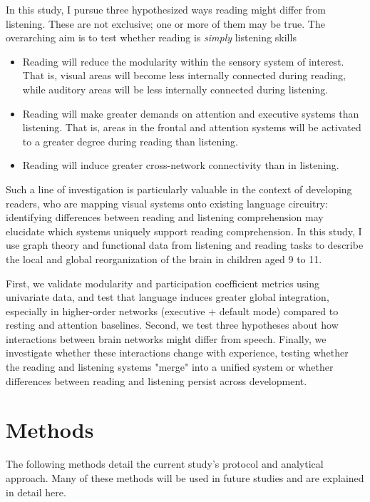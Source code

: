 In this study, I pursue three hypothesized ways reading might differ from listening. These are not exclusive; one or more of them may be true. The overarching aim is to test whether reading is \textit{simply} listening skills

\begin{itemize}
	\item Reading will reduce the modularity within the sensory system of interest. That is, visual areas will become less internally connected during reading, while auditory areas will be less internally connected during listening.
	\item Reading will make greater demands on attention and executive systems than listening. That is, areas in the frontal and attention systems will be activated to a greater degree during reading than listening.
	\item Reading will induce greater cross-network connectivity than in listening. 
\end{itemize}

Such a line of investigation is particularly valuable in the context of developing readers, who are mapping visual systems onto existing language circuitry: identifying differences between reading and listening comprehension may elucidate which systems uniquely support reading comprehension. In this study, I use graph theory and functional data from listening and reading tasks to describe the local and global reorganization of the brain in children aged 9 to 11.

First, we validate modularity and participation coefficient metrics using univariate data, and test that language induces greater global integration, especially in higher-order networks (executive + default mode) compared to resting and attention baselines. Second, we test three hypotheses about how interactions between brain networks might differ from speech. Finally, we investigate whether these interactions change with experience, testing whether the reading and listening systems "merge" into a unified system or whether differences between reading and listening persist across development.


\section{Methods}

The following methods detail the current study's protocol and analytical approach. Many of these methods will be used in future studies and are explained in detail here. 

